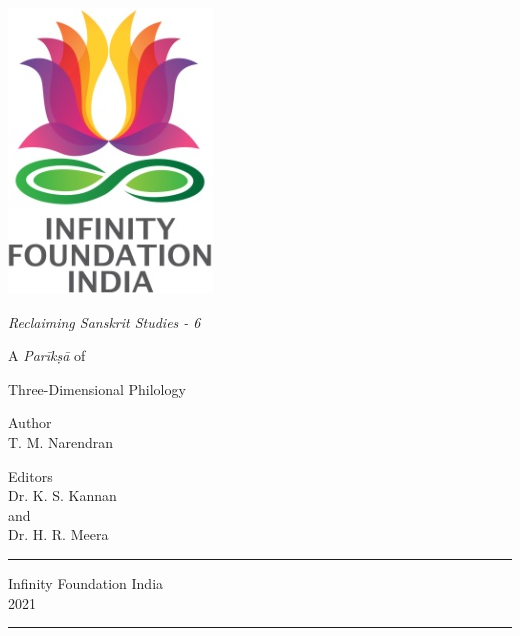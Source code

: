 \thispagestyle{empty}
\begin{center}
\includegraphics[scale=0.3]{images/logo.png}
\bigskip

{\fontsize{10}{14}\selectfont\sl
Reclaiming Sanskrit Studies - 6
}

\bigskip
\end{center}
\medskip

\begin{center}
{{\fontsize{20}{24}\selectfont A \textit{Parīkṣā} of}}

{{\fontsize{20}{24}\selectfont Three-Dimensional Philology}}

\vfill


{\fontsize{14}{18}\selectfont 
Author\\[2pt]
T. M. Narendran}\par

\bigskip
\bigskip

{\fontsize{14}{18}\selectfont 
Editors\\[3pt]
Dr. K. S. Kannan\\
and\\[3pt]
Dr. H. R. Meera}\par
\vfill

\rule{5cm}{1pt}

{\fontsize{12}{14}\selectfont
Infinity Foundation India\\[4pt]
2021}

\rule{5cm}{1pt}
\end{center}





